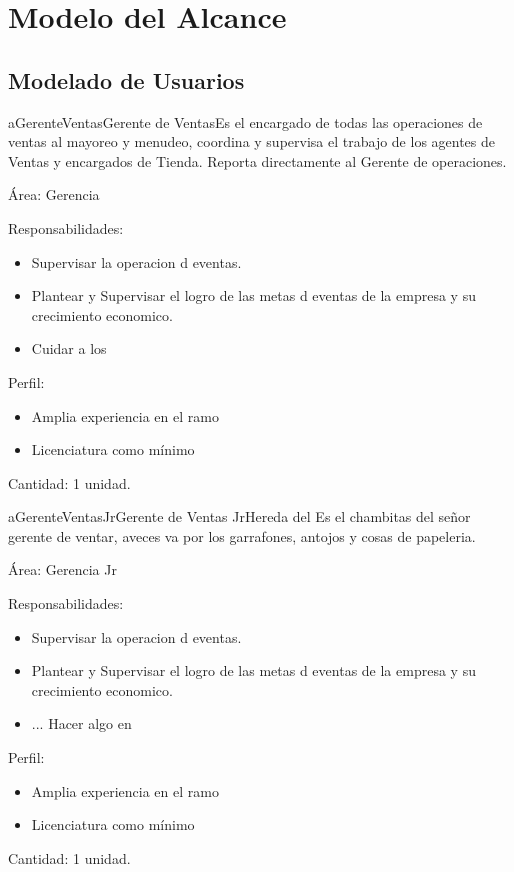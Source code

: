 \chapter{Modelo del Alcance}
\label{ch:modAlcance}

\section{Modelado de Usuarios}

\clearpage
\begin{actor}{aGerenteVentas}{Gerente de Ventas}{Es el encargado de todas las operaciones de ventas al mayoreo y menudeo, coordina y supervisa el trabajo de los agentes de Ventas y encargados de Tienda. Reporta directamente al Gerente de operaciones.}
    \item[Área:] Gerencia
    \item[Responsabilidades:] \hfill
        \begin{itemize}
            \item Supervisar la operacion d eventas.
            \item Plantear y Supervisar el logro de las metas d eventas de la empresa y su crecimiento economico.
            \item Cuidar a los 
        \end{itemize}
    \item[Perfil:] \hfill
        \begin{itemize}
            \item Amplia experiencia en el ramo
            \item Licenciatura como mínimo
        \end{itemize}
    \item[Cantidad:] 1 unidad.
\end{actor}

\begin{actor}{aGerenteVentasJr}{Gerente de Ventas Jr}{Hereda del  Es el chambitas del señor gerente de ventar, aveces va por los garrafones, antojos y cosas de papeleria.}
    \item[Área:] Gerencia Jr
    \item[Responsabilidades:] \hfill
        \begin{itemize}
            \item Supervisar la operacion d eventas.
            \item Plantear y Supervisar el logro de las metas d eventas de la empresa y su crecimiento economico.
            \item ... Hacer algo en 
        \end{itemize}
    \item[Perfil:] \hfill
        \begin{itemize}
            \item Amplia experiencia en el ramo
            \item Licenciatura como mínimo
        \end{itemize}
    \item[Cantidad:] 1 unidad.
\end{actor}

